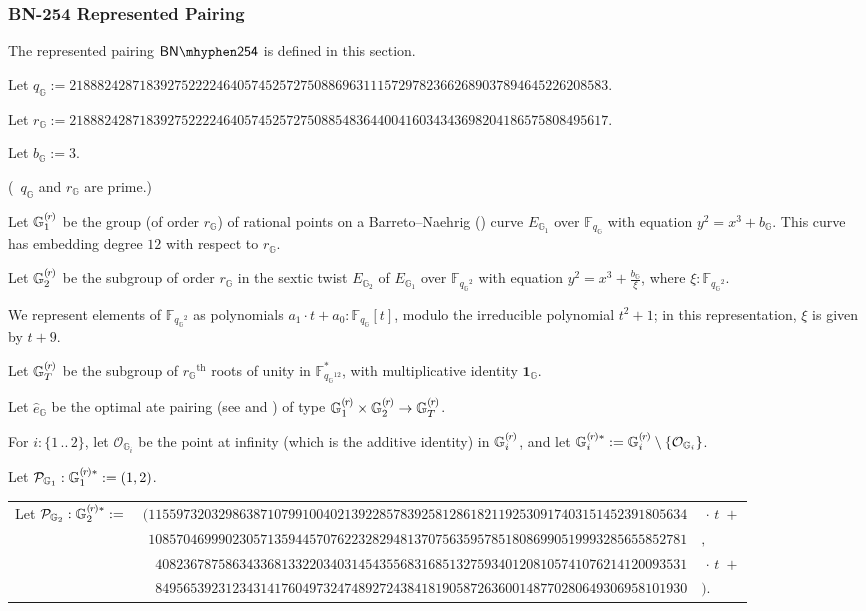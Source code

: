 \documentclass{article}
\newcommand{\typecolon}{:}
\newcommand{\hairspace}{~\!}
\newcommand{\Field}[1]{\mathbb{F}_{\!#1}}
\newcommand{\Fieldstar}[1]{\mathbb{F}^\ast_{#1}}
\newcommand{\setof}[1]{\{{#1}\}}
\newcommand{\barerange}[2]{{{#1}\,..\,{#2}}}
\newcommand{\range}[2]{\setof{\barerange{#1}{#2}}}
\newcommand{\mult}{\cdot}
\newcommand{\Curve}{E}
\newcommand{\Zero}{\mathcal{O}}
\newcommand{\Generator}{\mathcal{P}}
\newcommand{\subgroupr}{(\kern-0.075emr\kern-0.075em)}
\newcommand{\ParamG}[1]{{{#1}_\mathbb{G}}}
\newcommand{\ParamGexp}[2]{{{#1}_\mathbb{G}\!}^{#2}}
\newcommand{\GroupG}[1]{\mathbb{G}_{#1}}
\newcommand{\SubgroupG}[1]{\GroupG{#1}^{\subgroupr}}
\newcommand{\SubgroupGstar}[1]{\GroupG{#1}^{\subgroupr\ast}}
\newcommand{\CurveG}[1]{\Curve_{\GroupG{#1}}}
\newcommand{\ZeroG}[1]{\Zero_{\GroupG{#1}}}
\newcommand{\OneG}{\ParamG{\mathbf{1}}}
\newcommand{\GenG}[1]{\Generator_{\GroupG{#1}}}
\newcommand{\PairingG}{\ParamG{\hat{e}}}
\newcommand{\BNPairing}{\mathsf{BN\mhyphen254}}
\begin{document}
\subsubsection{BN-254 Represented Pairing} \label{bn254pairing}

The represented pairing $\BNPairing$ is defined in this section.

Let $\ParamG{q} := 21888242871839275222246405745257275088696311157297823662689037894645226208583$.

Let $\ParamG{r} := 21888242871839275222246405745257275088548364400416034343698204186575808495617$.

Let $\ParamG{b} := 3$.

(\hairspace $\ParamG{q}$ and $\ParamG{r}$ are prime.)

Let $\SubgroupG{1}$ be the group (of order $\ParamG{r}$) of rational points on a
Barreto--Naehrig (\cite{BN2005}) curve $\CurveG{1}$ over $\Field{\ParamG{q}}$ with equation $y^2 = x^3 + \ParamG{b}$.
This curve has embedding degree $12$ with respect to $\ParamG{r}$.

Let $\SubgroupG{2}$ be the subgroup of order $\ParamG{r}$ in the sextic twist $\CurveG{2}$ of
$\CurveG{1}$ over $\Field{\ParamGexp{q}{2}}$ with equation $y^2 = x^3 + \frac{\ParamG{b}}{\xi}$,
where $\xi \typecolon \Field{\ParamGexp{q}{2}}$.

We represent elements of $\Field{\ParamGexp{q}{2}}$ as polynomials
$a_1 \mult t + a_0 \typecolon \Field{\ParamG{q}}[t]$, modulo the irreducible polynomial
$t^2 + 1$; in this representation, $\xi$ is given by $t + 9$.

Let $\SubgroupG{T}$ be the subgroup of $\ParamGexp{r}{\mathrm{th}}$ roots of unity in
$\Fieldstar{\ParamGexp{q}{12}}$, with multiplicative identity $\OneG$.

Let $\PairingG$ be the optimal ate pairing (see \cite{Vercauter2009} and \cite[section 2]{AKLGL2010}) of type
$\SubgroupG{1} \times \SubgroupG{2} \rightarrow \SubgroupG{T}$.

For $i \typecolon \range{1}{2}$, let $\ZeroG{i}$ be the point at infinity
(which is the additive identity) in $\SubgroupG{i}$, and let
$\SubgroupGstar{i} := \SubgroupG{i} \setminus \setof{\ZeroG{i}}$.

Let $\GenG{1} \typecolon \SubgroupGstar{1} := (1, 2)$.

\begin{tabular}{@{}l@{}r@{}l@{}}
Let $\GenG{2} \typecolon \SubgroupGstar{2} :=\;$
&$(11559732032986387107991004021392285783925812861821192530917403151452391805634$ & $\,\mult\, t\;+$ \\
&$ 10857046999023057135944570762232829481370756359578518086990519993285655852781$ & $,             $ \\
&$  4082367875863433681332203403145435568316851327593401208105741076214120093531$ & $\,\mult\, t\;+$ \\
&$  8495653923123431417604973247489272438418190587263600148770280649306958101930$ & $).            $
\end{tabular}
\end{document}
